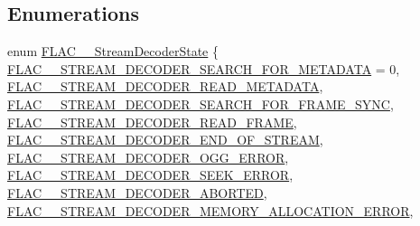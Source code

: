 \subsection*{Enumerations}
\begin{DoxyCompactItemize}
\item 
enum \hyperlink{group__flac__stream__decoder_ga3adb6891c5871a87cd5bbae6c770ba2d}{F\+L\+A\+C\+\_\+\+\_\+\+Stream\+Decoder\+State} \{ \newline
\hyperlink{group__flac__stream__decoder_gga3adb6891c5871a87cd5bbae6c770ba2dacf4455f4f681a6737a553e10f614704a}{F\+L\+A\+C\+\_\+\+\_\+\+S\+T\+R\+E\+A\+M\+\_\+\+D\+E\+C\+O\+D\+E\+R\+\_\+\+S\+E\+A\+R\+C\+H\+\_\+\+F\+O\+R\+\_\+\+M\+E\+T\+A\+D\+A\+TA} = 0, 
\hyperlink{group__flac__stream__decoder_gga3adb6891c5871a87cd5bbae6c770ba2da4c1853ed1babdcede9a908e12cf7ccf7}{F\+L\+A\+C\+\_\+\+\_\+\+S\+T\+R\+E\+A\+M\+\_\+\+D\+E\+C\+O\+D\+E\+R\+\_\+\+R\+E\+A\+D\+\_\+\+M\+E\+T\+A\+D\+A\+TA}, 
\hyperlink{group__flac__stream__decoder_gga3adb6891c5871a87cd5bbae6c770ba2daccff915757978117720ba1613d088ddf}{F\+L\+A\+C\+\_\+\+\_\+\+S\+T\+R\+E\+A\+M\+\_\+\+D\+E\+C\+O\+D\+E\+R\+\_\+\+S\+E\+A\+R\+C\+H\+\_\+\+F\+O\+R\+\_\+\+F\+R\+A\+M\+E\+\_\+\+S\+Y\+NC}, 
\hyperlink{group__flac__stream__decoder_gga3adb6891c5871a87cd5bbae6c770ba2da06dc6158a51a8eb9537b65f2fbb6dc49}{F\+L\+A\+C\+\_\+\+\_\+\+S\+T\+R\+E\+A\+M\+\_\+\+D\+E\+C\+O\+D\+E\+R\+\_\+\+R\+E\+A\+D\+\_\+\+F\+R\+A\+ME}, 
\newline
\hyperlink{group__flac__stream__decoder_gga3adb6891c5871a87cd5bbae6c770ba2da28ce845052d9d1a780f4107e97f4c853}{F\+L\+A\+C\+\_\+\+\_\+\+S\+T\+R\+E\+A\+M\+\_\+\+D\+E\+C\+O\+D\+E\+R\+\_\+\+E\+N\+D\+\_\+\+O\+F\+\_\+\+S\+T\+R\+E\+AM}, 
\hyperlink{group__flac__stream__decoder_gga3adb6891c5871a87cd5bbae6c770ba2da3bc0343f47153c5779baf7f37f6e95cf}{F\+L\+A\+C\+\_\+\+\_\+\+S\+T\+R\+E\+A\+M\+\_\+\+D\+E\+C\+O\+D\+E\+R\+\_\+\+O\+G\+G\+\_\+\+E\+R\+R\+OR}, 
\hyperlink{group__flac__stream__decoder_gga3adb6891c5871a87cd5bbae6c770ba2daf2c6efcabdfe889081c2260e6681db49}{F\+L\+A\+C\+\_\+\+\_\+\+S\+T\+R\+E\+A\+M\+\_\+\+D\+E\+C\+O\+D\+E\+R\+\_\+\+S\+E\+E\+K\+\_\+\+E\+R\+R\+OR}, 
\hyperlink{group__flac__stream__decoder_gga3adb6891c5871a87cd5bbae6c770ba2dadb52ab4785bd2eb84a95e8aa82311cd5}{F\+L\+A\+C\+\_\+\+\_\+\+S\+T\+R\+E\+A\+M\+\_\+\+D\+E\+C\+O\+D\+E\+R\+\_\+\+A\+B\+O\+R\+T\+ED}, 
\newline
\hyperlink{group__flac__stream__decoder_gga3adb6891c5871a87cd5bbae6c770ba2da0d08c527252420813e6a6d6d3e19324a}{F\+L\+A\+C\+\_\+\+\_\+\+S\+T\+R\+E\+A\+M\+\_\+\+D\+E\+C\+O\+D\+E\+R\+\_\+\+M\+E\+M\+O\+R\+Y\+\_\+\+A\+L\+L\+O\+C\+A\+T\+I\+O\+N\+\_\+\+E\+R\+R\+OR}, 

\end{DoxyCompactItemize}
